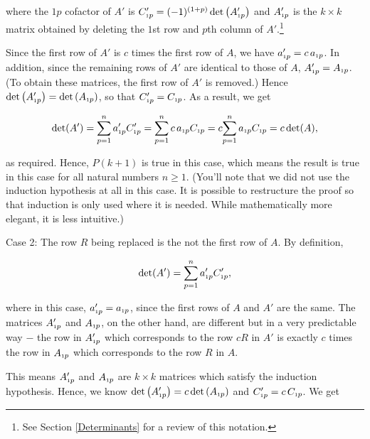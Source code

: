 \documentclass{ximera}
\begin{document}
\begin{ex}
\begin{enumerate}
where the $1p$ cofactor of $A'$ is $C'_{\mbox{\tiny$1$}p} = (-1)^{(1+p)} \det\left(A'_{\mbox{\tiny$1$}p}\right)$ and $A'_{\mbox{\tiny$1$}p}$ is the $k \times k$ matrix obtained by deleting the $1$st row and $p$th column of $A'$.\footnote{See Section \ref{Determinants} for a review of this notation.} 

\smallskip

Since the first row of $A'$ is $c$ times the first row of $A$,  we have $a'_{\mbox{\tiny$1$}p} = c \, a_{\mbox{\tiny$1$}p}$.  In addition, since the remaining rows of $A'$ are identical to those of $A$, $A'_{\mbox{\tiny$1$}p} = A_{\mbox{\tiny$1$}p}$.  (To obtain these matrices, the first row of $A'$ is removed.)  Hence $\det\left(A'_{\mbox{\tiny$1$}p}\right) = \det\left(A_{\mbox{\tiny$1$}p}\right)$, so that $C'_{\mbox{\tiny$1$}p} = C_{\mbox{\tiny$1$}p}$.  As a result, we get

\[ \det(A') = \displaystyle{\sum_{p=1}^{n} a'_{\mbox{\tiny$1$}p} C'_{\mbox{\tiny$1$}p}} = \displaystyle{\sum_{p=1}^{n} c \, a_{\mbox{\tiny$1$}p} C_{\mbox{\tiny$1$}p}} = c \displaystyle{\sum_{p=1}^{n} a_{\mbox{\tiny$1$}p} C_{\mbox{\tiny$1$}p}} = c \det(A), \]

as required.  Hence, $P(k+1)$ is true in this case, which means the result is true in this case for all natural numbers $n \geq 1$. (You'll note that we did not use the induction hypothesis at all in this case.  It is possible to restructure the proof so that induction is only used where it is needed.  While mathematically more elegant, it is less intuitive.)

{\sc Case 2:} The row $R$ being replaced is the not the first row of $A$.  By definition,

\[ \det(A') = \displaystyle{\sum_{p=1}^{n} a'_{\mbox{\tiny$1$}p} C'_{\mbox{\tiny$1$}p}},\]

where in this case, $a'_{\mbox{\tiny$1$}p} = a_{\mbox{\tiny$1$}p}$, since the first rows of $A$ and $A'$ are the same. The matrices $A'_{\mbox{\tiny$1$}p}$ and $A_{\mbox{\tiny$1$}p}$, on the other hand, are different but in a very predictable way $-$ the row in $A'_{\mbox{\tiny$1$}p}$ which corresponds to the row $cR$ in $A'$ is exactly $c$ times the row in $A_{\mbox{\tiny$1$}p}$ which corresponds to the row $R$ in $A$. 

\smallskip

This means $A'_{\mbox{\tiny$1$}p}$ and $A_{\mbox{\tiny$1$}p}$ are $k \times k$ matrices which satisfy the induction hypothesis.  Hence, we know $\det\left(A'_{\mbox{\tiny$1$}p}\right) = c \det\left(A_{\mbox{\tiny$1$}p}\right)$ and $C'_{\mbox{\tiny$1$}p} = c \, C_{\mbox{\tiny$1$}p}$.  We get


\end{enumerate}
\end{ex}
\end{document}
